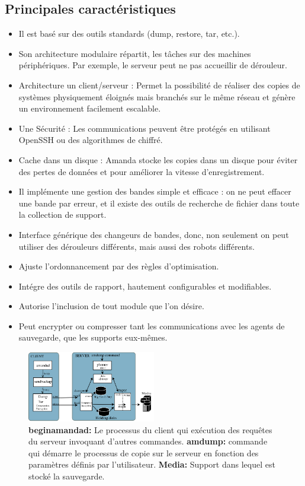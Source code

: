 \documentclass[a4paper,11pt]{report}
\begin{document}
\subsection{Principales caractéristiques}
\begin{itemize}
  \item Il est basé sur des outils standards (dump, restore, tar, etc.).
  \item Son architecture modulaire répartit, les tâches sur des machines périphériques. Par exemple, le serveur peut ne pas accueillir de dérouleur.
  \item Architecture un client/serveur : Permet la possibilité de réaliser des copies de systèmes physiquement éloignés mais branchés sur le même réseau et génère un environnement facilement escalable.
  \item Une Sécurité : Les communications peuvent être protégés en utilisant OpenSSH ou des algorithmes de chiffré.
  \item Cache dans un disque : Amanda stocke les copies dans un disque pour éviter des pertes de données et pour améliorer la vitesse d'enregistrement.
  \item Il implémente une gestion des bandes simple et efficace : on ne peut effacer une bande par erreur, et il existe des outils de recherche de fichier dans toute la collection de support.
  \item Interface générique des changeurs de bandes, donc, non seulement on peut utiliser des dérouleurs différents, mais aussi des robots différents.
  \item Ajuste l’ordonnancement par des règles d’optimisation.
  \item Intégre des outils de rapport, hautement configurables et modifiables.
  \item Autorise l’inclusion de tout module que l’on désire.
  \item Peut encrypter ou compresser tant les communications avec les agents de sauvegarde, que les supports eux-mêmes.

\end{itemize}

\begin{figure} [h]
\begin {center}
\includegraphics[width=0.5\textwidth]{amanda.png}
\caption{\textbf{beginamandad:} Le processus du client qui exécution des requêtes du serveur invoquant d'autres commandes.
\textbf{amdump:} commande qui démarre le processus de copie sur le serveur en fonction des paramètres définis par l'utilisateur.
\textbf{Media:} Support dans lequel est stocké la sauvegarde.}
\end {center}
\end{figure}
\end{document}
